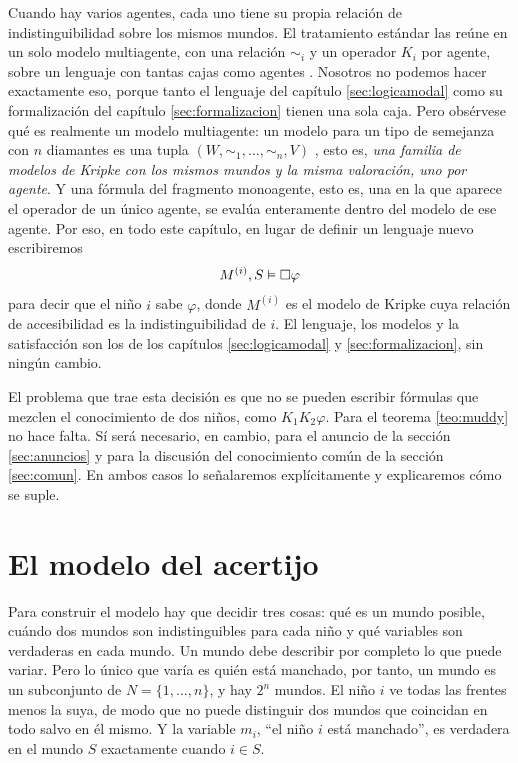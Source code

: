 Cuando hay varios agentes, cada uno tiene su propia relación de indistinguibilidad sobre los mismos mundos. El tratamiento estándar las reúne en un solo modelo multiagente, con una relación $\sim_i$ y un operador $K_i$ por agente, sobre un lenguaje con tantas cajas como agentes \cite[cap.~2]{fhmv}. Nosotros no podemos hacer exactamente eso, porque tanto el lenguaje del capítulo \ref{sec:logicamodal} como su formalización del capítulo \ref{sec:formalizacion} tienen una sola caja. Pero obsérvese qué es realmente un modelo multiagente: un modelo para un tipo de semejanza con $n$ diamantes es una tupla $(W, \sim_1, \dots, \sim_n, V)$ \cite[Def.~1.23]{blackburn}, esto es, \emph{una familia de modelos de Kripke con los mismos mundos y la misma valoración, uno por agente}. Y una fórmula del fragmento monoagente, esto es, una en la que aparece el operador de un único agente, se evalúa enteramente dentro del modelo de ese agente. Por eso, en todo este capítulo, en lugar de definir un lenguaje nuevo escribiremos
\[
  M^{(i)}, S \vDash \square\varphi
\]
para decir que el niño $i$ sabe $\varphi$, donde $M^{(i)}$ es el modelo de Kripke cuya relación de accesibilidad es la indistinguibilidad de $i$. El lenguaje, los modelos y la satisfacción son los de los capítulos \ref{sec:logicamodal} y \ref{sec:formalizacion}, sin ningún cambio.

El problema que trae esta decisión es que no se pueden escribir fórmulas que mezclen el conocimiento de dos niños, como $K_1K_2\varphi$. Para el teorema \ref{teo:muddy} no hace falta. Sí será necesario, en cambio, para el anuncio de la sección \ref{sec:anuncios} y para la discusión del conocimiento común de la sección \ref{sec:comun}. En ambos casos lo señalaremos explícitamente y explicaremos cómo se suple.

\section{El modelo del acertijo}\label{sec:modelo-ninos}

Para construir el modelo hay que decidir tres cosas: qué es un mundo posible, cuándo dos mundos son indistinguibles para cada niño y qué variables son verdaderas en cada mundo. Un mundo debe describir por completo lo que puede variar. Pero lo único que varía es quién está manchado, por tanto, un mundo es un subconjunto de $N = \{1,\dots,n\}$, y hay $2^n$ mundos. El niño $i$ ve todas las frentes menos la suya, de modo que no puede distinguir dos mundos que coincidan en todo salvo en él mismo. Y la variable $m_i$, ``el niño $i$ está manchado'', es verdadera en el mundo $S$ exactamente cuando $i \in S$.

